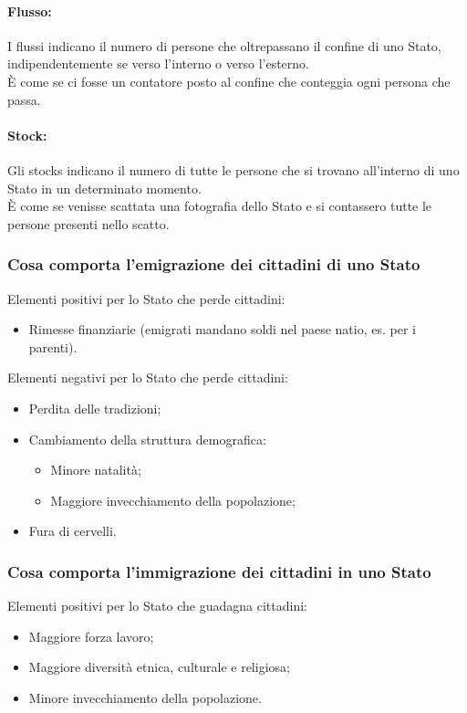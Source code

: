 \documentclass{article}
\begin{document}
\paragraph*{Flusso:} \phantom{}

I flussi indicano il numero di persone che oltrepassano il confine di uno
Stato, indipendentemente se verso l'interno o verso l'esterno.\\
È come se ci fosse un contatore posto al confine che conteggia ogni persona che passa.
\paragraph*{Stock:} \phantom{}

Gli stocks indicano il numero di tutte le persone che si trovano all'interno di uno Stato in un
determinato momento.\\
È come se venisse scattata una fotografia dello Stato e si contassero
tutte le persone presenti nello scatto.
\pagebreak
\subsubsection{Cosa comporta l'emigrazione dei cittadini di uno Stato}
Elementi positivi per lo Stato che perde cittadini:
\begin{itemize}
    \item Rimesse finanziarie (emigrati mandano soldi nel paese natio, es. per i parenti).
\end{itemize} \phantom{}

Elementi negativi per lo Stato che perde cittadini:
\begin{itemize}
    \item Perdita delle tradizioni;
    \item Cambiamento della struttura demografica:
        \begin{itemize}
            \item Minore natalità;
            \item Maggiore invecchiamento della popolazione;
        \end{itemize}
    \item Fura di cervelli.
\end{itemize}

\subsubsection{Cosa comporta l'immigrazione dei cittadini in uno Stato}
Elementi positivi per lo Stato che guadagna cittadini:
\begin{itemize}
    \item Maggiore forza lavoro;
    \item Maggiore diversità etnica, culturale e religiosa;
    \item Minore invecchiamento della popolazione.
\end{itemize} \phantom{}
\end{document}
